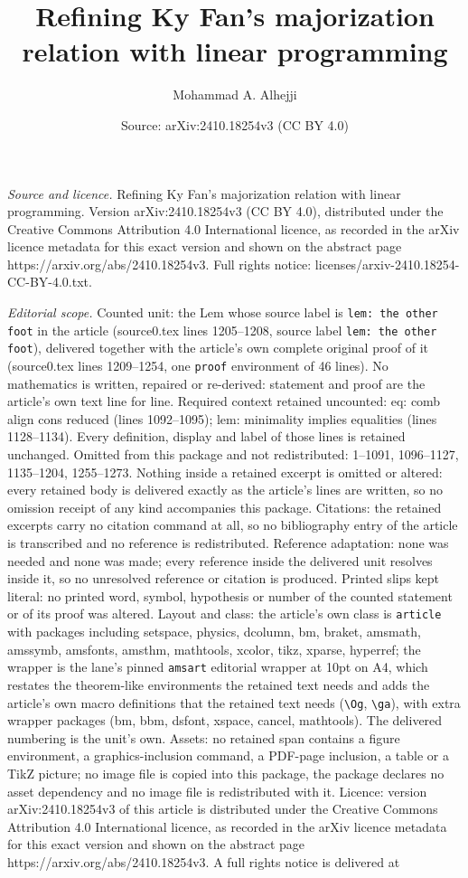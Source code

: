 \documentclass[10pt,a4paper]{amsart}
\title[Refining Ky Fan's majorization relation with linear programm]{Refining Ky Fan's majorization relation with linear programming}
\author{Mohammad A. Alhejji}
\date{Source: arXiv:2410.18254v3 (CC BY 4.0)}
\begin{document}
\maketitle

\noindent\emph{Source and licence.} Refining Ky Fan's majorization relation with linear programming. Version arXiv:2410.18254v3 (CC BY 4.0), distributed under the Creative Commons Attribution 4.0 International licence, as recorded in the arXiv licence metadata for this exact version and shown on the abstract page https://arxiv.org/abs/2410.18254v3. Full rights notice: licenses/arxiv-2410.18254-CC-BY-4.0.txt.\par\smallskip

\noindent\textit{Editorial scope.} Counted unit: the Lem whose source label is \texttt{lem: the other foot} in the article (source0.tex lines 1205--1208, source label \texttt{lem: the other foot}), delivered together with the article's own complete original proof of it (source0.tex lines 1209--1254, one \texttt{proof} environment of 46 lines). No mathematics is written, repaired or re-derived: statement and proof are the article's own text line for line. Required context retained uncounted: eq: comb align cons reduced (lines 1092--1095); lem: minimality implies equalities (lines 1128--1134). Every definition, display and label of those lines is retained unchanged. Omitted from this package and not redistributed: 1--1091, 1096--1127, 1135--1204, 1255--1273. Nothing inside a retained excerpt is omitted or altered: every retained body is delivered exactly as the article's lines are written, so no omission receipt of any kind accompanies this package. Citations: the retained excerpts carry no citation command at all, so no bibliography entry of the article is transcribed and no reference is redistributed. Reference adaptation: none was needed and none was made; every reference inside the delivered unit resolves inside it, so no unresolved reference or citation is produced. Printed slips kept literal: no printed word, symbol, hypothesis or number of the counted statement or of its proof was altered. Layout and class: the article's own class is \texttt{article} with packages including setspace, physics, dcolumn, bm, braket, amsmath, amssymb, amsfonts, amsthm, mathtools, xcolor, tikz, xparse, hyperref; the wrapper is the lane's pinned \texttt{amsart} editorial wrapper at 10pt on A4, which restates the theorem-like environments the retained text needs and adds the article's own macro definitions that the retained text needs (\texttt{\textbackslash Og}, \texttt{\textbackslash ga}), with extra wrapper packages (bm, bbm, dsfont, xspace, cancel, mathtools). The delivered numbering is the unit's own. Assets: no retained span contains a figure environment, a graphics-inclusion command, a PDF-page inclusion, a table or a TikZ picture; no image file is copied into this package, the package declares no asset dependency and no image file is redistributed with it. Licence: version arXiv:2410.18254v3 of this article is distributed under the Creative Commons Attribution 4.0 International licence, as recorded in the arXiv licence metadata for this exact version and shown on the abstract page https://arxiv.org/abs/2410.18254v3. A full rights notice is delivered at 
\end{document}
